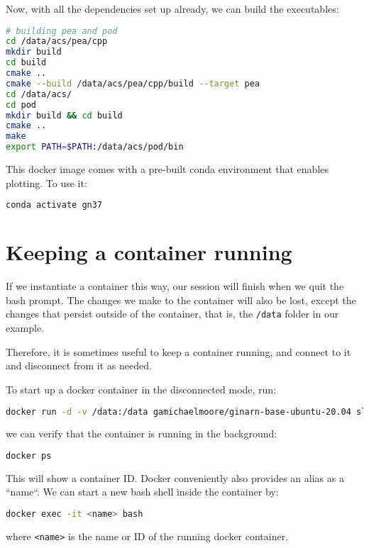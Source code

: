 Now, with all the dependencies set up already, we can build the executables:

\begin{lstlisting}[language=bash]
# building pea and pod
cd /data/acs/pea/cpp
mkdir build
cd build
cmake ..
cmake --build /data/acs/pea/cpp/build --target pea
cd /data/acs/
cd pod
mkdir build && cd build
cmake ..
make
export PATH=$PATH:/data/acs/pod/bin
\end{lstlisting}

This docker image comes with a pre-built conda environment that enables plotting. To use it:
\begin{lstlisting}[language=bash]
conda activate gn37
\end{lstlisting}

\section{Keeping a container running}
If we instantiate a container this way, our session will finish when we quit the bash prompt.
The changes we make to the container will also be lost, except the changes that persist outside
of the container, that is, the \texttt{/data} folder in our example.

Therefore, it is sometimes useful to keep a container running, and connect to it and disconnect
from it as needed.

To start up a docker container in the disconnected mode, run:
\begin{lstlisting}[language=bash]
docker run -d -v /data:/data gamichaelmoore/ginarn-base-ubuntu-20.04 sleep infinity
\end{lstlisting}
we can verify that the container is running in the background:
\begin{lstlisting}[language=bash]
docker ps
\end{lstlisting}
This will show a container ID. Docker conveniently also provides an alias as a ``name``.
We can start a new bash shell inside the container by:
\begin{lstlisting}[language=bash]
docker exec -it <name> bash
\end{lstlisting}
where \texttt{<name>} is the name or ID of the running docker container.



